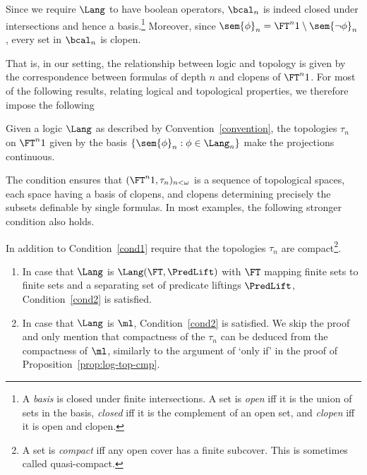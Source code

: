 \documentclass{entcs}
\begin{document}
Since we require $\Lang$ to have boolean operators, $\bcal_n$ is
indeed closed under intersections and hence a basis.\footnote{A
  \emph{basis} is closed under finite intersections. A set is
  \emph{open} iff it is the union of sets in the basis, \emph{closed}
  iff it is the complement of an open set, and \emph{clopen} iff it is
  open and clopen.} Moreover, since $\sem{\phi}_n=\FT^n
1\setminus\sem{\neg\phi}_n$, every set in $\bcal_n$ is clopen.

\pskip That is, in our setting, the relationship between logic and
topology is given by the correspondence between formulas of depth $n$
and clopens of $\FT^n 1$. For most of the following results, relating
logical and topological properties, we therefore impose the following
%
\begin{condition}\label{cond1}
  Given a logic $\Lang$ as described by Convention~\ref{convention},
  the topologies $\tau_n$ on $\FT ^n 1$ given by the basis
  $\{\sem{\phi}_n: \phi\in\Lang_n\}$ make the projections continuous.
\end{condition}
%
\noindent
The condition ensures that $(\FT^n 1,\tau_n)_{n<\omega}$ is a sequence
of topological spaces, each space having a basis of clopens, and
clopens determining precisely the subsets definable by single
formulas. In most examples, the following stronger condition also
holds.
%
\begin{condition}\label{cond2}
  In addition to Condition~\ref{cond1} require that the topologies $\tau_n$
  are compact\footnote{A set is \emph{compact} iff any open cover has a finite
    subcover.  This is sometimes called quasi-compact.}.
\end{condition}
%
\begin{example}\label{exle:conditions}
\begin{enumerate}
\item In case that $\Lang$ is $\Lang(\FT,\PredLift)$ with $\FT$
  mapping finite sets to finite sets and a separating set of predicate
  liftings $\PredLift$, Condition~\ref{cond2} is satisfied.
\item In case that $\Lang$ is $\ml$, Condition~\ref{cond2} is satisfied. We
  skip the proof and only mention that compactness of the $\tau_n$ can be
  deduced from the compactness of $\ml$, similarly to the argument of `only
  if' in the proof of Proposition~\ref{prop:log-top-cmp}.
\end{enumerate}
\end{example}
\end{document}
